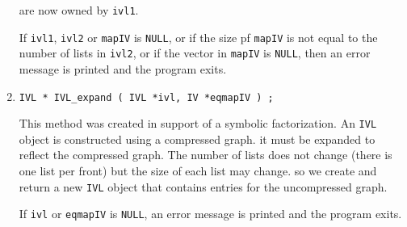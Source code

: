 \begin{enumerate}
are now owned by {\tt ivl1}.
\par {}
If {\tt ivl1}, {\tt ivl2} or {\tt mapIV} is {\tt NULL},
or if the size pf {\tt mapIV} is not equal to the number of lists
in {\tt ivl2}, or if the vector in {\tt mapIV} is {\tt NULL},
then an error message is printed and the program exits.
\item
\begin{verbatim}
IVL * IVL_expand ( IVL *ivl, IV *eqmapIV ) ;
\end{verbatim}
This method was created in support of a symbolic factorization.
An {\tt IVL} object is constructed using a compressed graph.
it must be expanded to reflect the compressed graph.
The number of lists does not change (there is one list per front)
but the size of each list may change. so we create and return a new 
{\tt IVL} object that contains entries for the uncompressed graph.
\par {}
If {\tt ivl} or {\tt eqmapIV} is {\tt NULL},
an error message is printed and the program exits.
\end{enumerate}
\par
